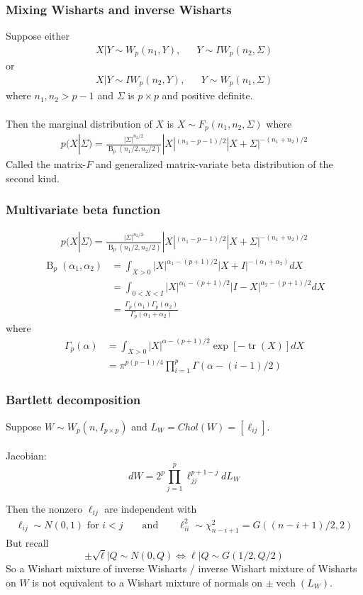 \documentclass[xcolor=dvipsnames]{beamer}
\DeclareMathOperator{\tr}{tr}
\DeclareMathOperator{\B}{B}
\DeclareMathOperator{\vech}{vech}
\begin{document}
\begin{frame}
\frametitle{Mixing Wisharts and inverse Wisharts}
Suppose either 
\begin{align*}
X|Y \sim W_p(n_1,Y), &&Y\sim IW_p(n_2,\Sigma)
\end{align*}
or
\begin{align*}
X|Y \sim IW_p(n_2,Y), &&Y\sim W_p(n_1,\Sigma)
\end{align*}
where $n_1,n_2>p-1$ and $\Sigma$ is $p\times p$ and positive definite.\\~\\
\pause 
Then the marginal distribution of $X$ is $X\sim F_p(n_1,n_2,\Sigma)$ where
\begin{align*}
 p(X|\Sigma) = \frac{\left|\Sigma\right|^{n_2/2}}{\B_p(n_1/2,n_2/2)}|X|^{(n_1 - p - 1)/2}|X + \Sigma|^{-(n_1 + n_2)/2}
\end{align*}
Called the matrix-$F$ and generalized matrix-variate beta distribution of the second kind.
\end{frame}

\begin{frame}
\frametitle{Multivariate beta function}
\begin{align*}
  p(X|\Sigma) = \frac{\left|\Sigma\right|^{n_2/2}}{\B_p(n_1/2,n_2/2)}|X|^{(n_1 - p - 1)/2}|X + \Sigma|^{-(n_1 + n_2)/2}
\end{align*}
\pause
\begin{align*}
\B_p(\alpha_1, \alpha_2) &= \int_{X>0}|X|^{\alpha_1 - (p + 1)/2}|X + I|^{-(\alpha_1 + \alpha_2)}dX\\
&= \int_{0<X<I}|X|^{\alpha_1 - (p + 1)/2}|I-X|^{\alpha_2 - (p + 1)/2}dX\\
&=\frac{\Gamma_p(\alpha_1)\Gamma_p(\alpha_2)}{\Gamma_p(\alpha_1 + \alpha_2)}
\end{align*}
\pause where
\begin{align*}
\Gamma_p(\alpha) &= \int_{X>0}|X|^{\alpha - (p+1)/2}\exp\left[-\tr(X)\right]dX\\
&=\pi^{p(p-1)/4}\prod_{i=1}^p\Gamma(\alpha - (i-1)/2)
\end{align*}
\end{frame}

\begin{frame}
\frametitle{Bartlett decomposition}
Suppose $W\sim W_p(n, I_{p\times p})$ and $L_W=Chol(W)=[\ell_{ij}]$.\\~\\

Jacobian: 
\[
dW = 2^p\prod_{j=1}^p\ell_{jj}^{p+1-j} dL_W
\]

Then the nonzero $\ell_{ij}$ are independent with 
\begin{align*}
\ell_{ij}\sim N(0,1)\mbox{ for }i<j&&\mbox{ and }&& \ell_{ii}^2\sim\chi^2_{n-i+1} = G((n-i+1)/2, 2)
\end{align*}
\pause But recall 
\[
\pm \sqrt{\ell}|Q \sim N(0,Q) \iff \ell|Q\sim G(1/2,Q/2)
\]
\pause So a Wishart mixture of inverse Wisharts / inverse Wishart mixture of Wisharts on $W$ is not equivalent to a Wishart mixture of normals on $\pm\vech(L_W)$.
\end{frame}
\end{document}

